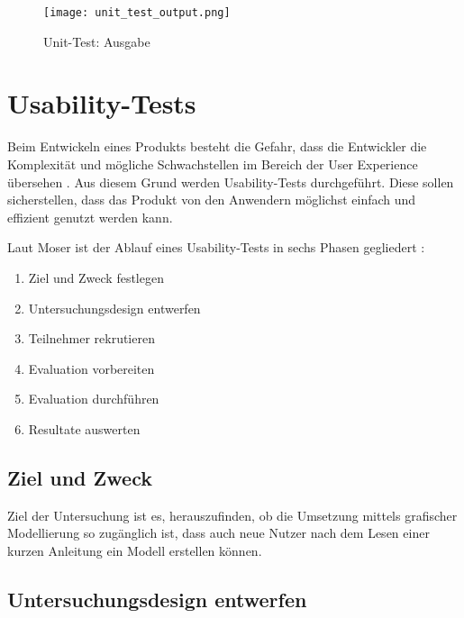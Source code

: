 \begin{figure}[H]
    \centering
    \texttt{[image: unit\_test\_output.png]}
    \caption{Unit-Test: Ausgabe}
    \label{fig:unit4}
\end{figure}

\section{Usability-Tests}

Beim Entwickeln eines Produkts besteht die Gefahr, dass die Entwickler die Komplexität und mögliche Schwachstellen im Bereich der User Experience übersehen \cite{Witte2018}. Aus diesem Grund werden Usability-Tests durchgeführt. Diese sollen sicherstellen, dass das Produkt von den Anwendern möglichst einfach und effizient genutzt werden kann.

Laut Moser ist der Ablauf eines Usability-Tests in sechs Phasen gegliedert \cite{Moser2012}:
\begin{enumerate}
    \item Ziel und Zweck festlegen
    \item Untersuchungsdesign entwerfen
    \item Teilnehmer rekrutieren
    \item Evaluation vorbereiten
    \item Evaluation durchführen
    \item Resultate auswerten
\end{enumerate}

\subsection{Ziel und Zweck}
Ziel der Untersuchung ist es, herauszufinden, ob die Umsetzung mittels grafischer Modellierung so zugänglich ist, dass auch neue Nutzer nach dem Lesen einer kurzen Anleitung ein Modell erstellen können.

\subsection{Untersuchungsdesign entwerfen}

